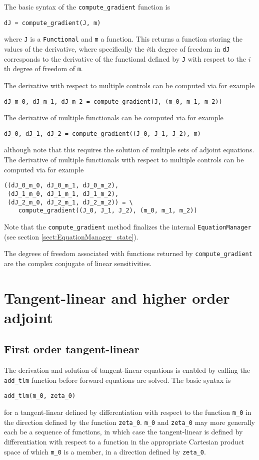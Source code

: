 \documentclass[11pt]{article}
\begin{document}
The basic syntax of the \texttt{compute\_gradient} function is
\begin{lstlisting}
dJ = compute_gradient(J, m)
\end{lstlisting}
where \texttt{J} is a \texttt{Functional} and \texttt{m} a function. This
returns a function storing the values of the derivative, where specifically the
$i$th degree of freedom in \texttt{dJ} corresponds to the derivative of the
functional defined by \texttt{J} with respect to the $i$th degree of freedom of
\texttt{m}.

The derivative with respect to multiple controls can be computed via for
example
\begin{lstlisting}
dJ_m_0, dJ_m_1, dJ_m_2 = compute_gradient(J, (m_0, m_1, m_2))
\end{lstlisting}
The derivative of multiple functionals can be computed via for example
\begin{lstlisting}
dJ_0, dJ_1, dJ_2 = compute_gradient((J_0, J_1, J_2), m)
\end{lstlisting}
although note that this requires the solution of multiple sets of adjoint
equations. The derivative of multiple functionals with respect to multiple
controls can be computed via for example
\begin{lstlisting}
((dJ_0_m_0, dJ_0_m_1, dJ_0_m_2),
 (dJ_1_m_0, dJ_1_m_1, dJ_1_m_2),
 (dJ_2_m_0, dJ_2_m_1, dJ_2_m_2)) = \
    compute_gradient((J_0, J_1, J_2), (m_0, m_1, m_2))
\end{lstlisting}

Note that the \texttt{compute\_gradient} method finalizes the internal
\texttt{EquationManager} (see section \ref{sect:EquationManager_state}).

The degrees of freedom associated with functions returned by
\texttt{compute\_gradient} are the complex conjugate of linear sensitivities.

\section{Tangent-linear and higher order adjoint}\label{sect:higher_order}

\subsection{First order tangent-linear}

The derivation and solution of tangent-linear equations is enabled by calling
the \texttt{add\_tlm} function before forward equations are solved. The basic
syntax is
\begin{lstlisting}
add_tlm(m_0, zeta_0)
\end{lstlisting}
for a tangent-linear defined by differentiation with respect to the function
\texttt{m\_0} in the direction defined by the function \texttt{zeta\_0}.
\texttt{m\_0} and \texttt{zeta\_0} may more generally each be a sequence of
functions, in which case the tangent-linear is defined by differentiation with
respect to a function in the appropriate Cartesian product space of which
\texttt{m\_0} is a member, in a direction defined by \texttt{zeta\_0}.
\end{document}
